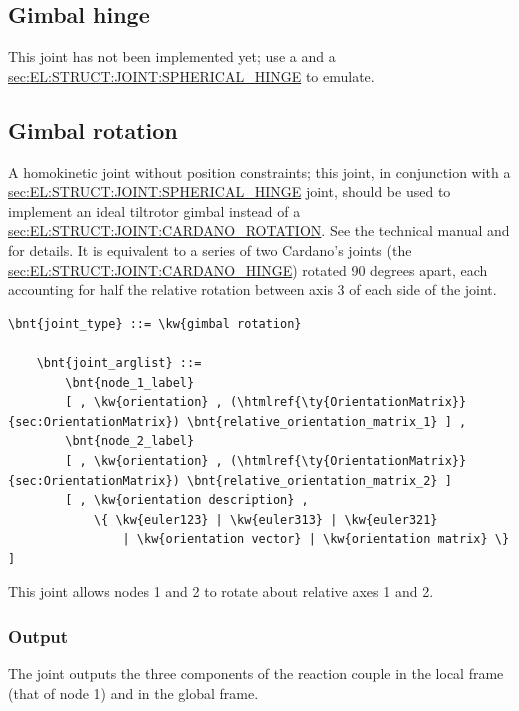 \subsection{Gimbal hinge}
This joint has not been implemented yet; use a 
and a
\hyperref{\kw{spherical hinge}}{\kw{spherical hinge} (see Section~}{)}{sec:EL:STRUCT:JOINT:SPHERICAL_HINGE}
to emulate.

\subsection{Gimbal rotation}\label{sec:EL:JOINT:GIMBALROTATION}
A homokinetic joint without position constraints;
this joint, in conjunction with a
\hyperref{\kw{spherical hinge}}{\kw{spherical hinge} (see Section~}{)}{sec:EL:STRUCT:JOINT:SPHERICAL_HINGE}
joint, should be used to implement an ideal tiltrotor gimbal
instead of a
\hyperref{\kw{cardano rotation}}{\kw{cardano rotation} (see Section~}{)}{sec:EL:STRUCT:JOINT:CARDANO_ROTATION}.
See the technical manual and \cite{GIMBAL-2008} for details.
It is equivalent to a series of two Cardano's joints
(the \hyperref{\kw{cardano hinge}}{\kw{cardano hinge}, see Section~}{}{sec:EL:STRUCT:JOINT:CARDANO_HINGE})
rotated 90 degrees apart, each accounting for half the relative rotation
between axis 3 of each side of the joint.
\begin{Verbatim}[commandchars=\\\{\}]
    \bnt{joint_type} ::= \kw{gimbal rotation}

    \bnt{joint_arglist} ::= 
        \bnt{node_1_label}
        [ , \kw{orientation} , (\htmlref{\ty{OrientationMatrix}}{sec:OrientationMatrix}) \bnt{relative_orientation_matrix_1} ] ,
        \bnt{node_2_label}
        [ , \kw{orientation} , (\htmlref{\ty{OrientationMatrix}}{sec:OrientationMatrix}) \bnt{relative_orientation_matrix_2} ]
        [ , \kw{orientation description} ,
            \{ \kw{euler123} | \kw{euler313} | \kw{euler321}
                | \kw{orientation vector} | \kw{orientation matrix} \} ]
\end{Verbatim}
This joint allows nodes 1 and 2 to rotate about relative axes 1 and 2.

\subsubsection{Output}
The  joint outputs the three components
of the reaction couple in the local frame (that of node 1) 
and in the global frame.


